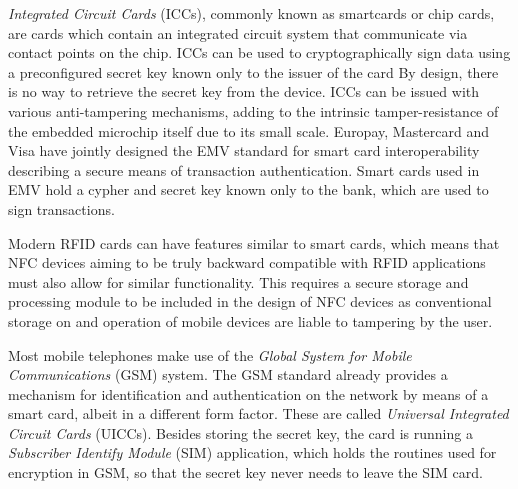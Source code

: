 
\textit{Integrated Circuit Cards} (ICCs), commonly known as smartcards or chip cards, are cards which contain an integrated circuit system that communicate via contact points on the chip.
ICCs can be used to cryptographically sign data using a preconfigured secret key known only to the issuer of the card 
By design, there is no way to retrieve the secret key from the device.
ICCs can be issued with various anti-tampering mechanisms, adding to the intrinsic tamper-resistance of the embedded microchip itself due to its small scale. \cite{kömmerling1999design}
Europay, Mastercard and Visa have jointly designed the EMV standard for smart card interoperability describing a secure means of transaction authentication. %
Smart cards used in EMV hold a cypher and secret key known only to the bank, which are used to sign transactions.

Modern RFID cards can have features similar to smart cards, which means that NFC devices aiming to be truly backward compatible with RFID applications must also allow for similar functionality.
This requires a secure storage and processing module to be included in the design of NFC devices as conventional storage on and operation of mobile devices are liable to tampering by the user.

Most mobile telephones make use of the \textit{Global System for Mobile Communications} (GSM) system.
The GSM standard already provides a mechanism for identification and authentication on the network by means of a smart card, albeit in a different form factor.
These are called \textit{Universal Integrated Circuit Cards} (UICCs).
Besides storing the secret key, the card is running a \textit{Subscriber Identify Module} (SIM) application, which holds the routines used for encryption in GSM, so that the secret key never needs to leave the SIM card. %

